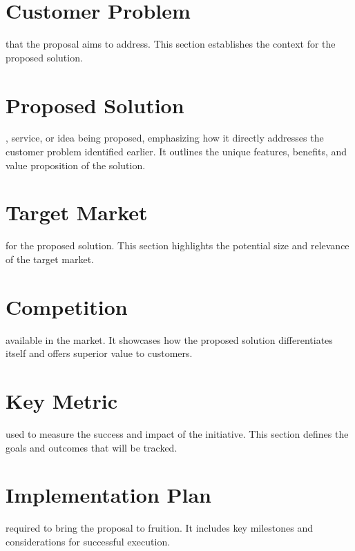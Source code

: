 \documentclass{tufte-handout}
\begin{document}
\section{Customer Problem}\label{cust-pbm}
   that the proposal aims to address. This section establishes the context for the proposed solution.

\section{Proposed Solution}\label{proposed-solution}
  , service, or idea being proposed, emphasizing how it directly addresses the customer problem identified earlier. It outlines the unique features, benefits, and value proposition of the solution.

\section{Target Market}\label{target-market}
   for the proposed solution. This section highlights the potential size and relevance of the target market.

\section{Competition}\label{Competition}
   available in the market. It showcases how the proposed solution differentiates itself and offers superior value to customers.

\section{Key Metric}\label{key-metrics}
   used to measure the success and impact of the initiative. This section defines the goals and outcomes that will be tracked.

\section{Implementation Plan}\label{implementation-plan}
   required to bring the proposal to fruition. It includes key milestones and considerations for successful execution.
\end{document}
